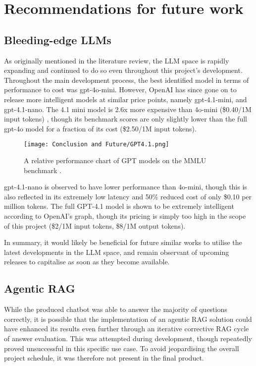 \chapter{Recommendations for future work}

\section{Bleeding-edge LLMs}
As originally mentioned in the literature review, the LLM space is rapidly expanding and continued to do so even throughout this project's 
development. Throughout the main development process, the best identified model in terms of performance to cost was gpt-4o-mini. However,
OpenAI has since gone on to release more intelligent models at similar price points, namely gpt-4.1-mini, and gpt-4.1-nano. The 4.1 mini model 
is 2.6x more expensive than 4o-mini (\$0.40/1M input tokens) \autocite{openaiPricingOpenAIAPI}, 
though its benchmark scores are only slightly lower than the full gpt-4o model for a fraction of its cost (\$2.50/1M input tokens). 

\begin{figure}[H]
    \centering
    \texttt{[image: Conclusion and Future/GPT4.1.png]}
    \caption{A relative performance chart of GPT models on the MMLU benchmark \autocite{openaiIntroducingGPT41API}.\label{fig:GPT41Perf}}
\end{figure}

\noindent gpt-4.1-nano is observed to have lower performance than 4o-mini, though this is also reflected in its extremely low latency and 
50\% reduced cost of only \$0.10 per million tokens. The full GPT-4.1 model is shown to be extremely intelligent according to OpenAI's graph,
though its pricing is simply too high in the scope of this project (\$2/1M input tokens, \$8/1M output tokens).

\para In summary, it would likely be beneficial for future similar works to utilise the latest developments in the LLM space, and remain observant 
of upcoming releases to capitalise as soon as they become available.

\section{Agentic RAG}
While the produced chatbot was able to answer the majority of questions correctly, it is possible that the implementation of an agentic RAG 
solution could have enhanced its results even further through an iterative corrective RAG cycle of answer evaluation. 
This was attempted during development, though repeatedly proved unsuccessful in this specific use case. 
To avoid jeopardising the overall project schedule, it was therefore not present in the final product. 

